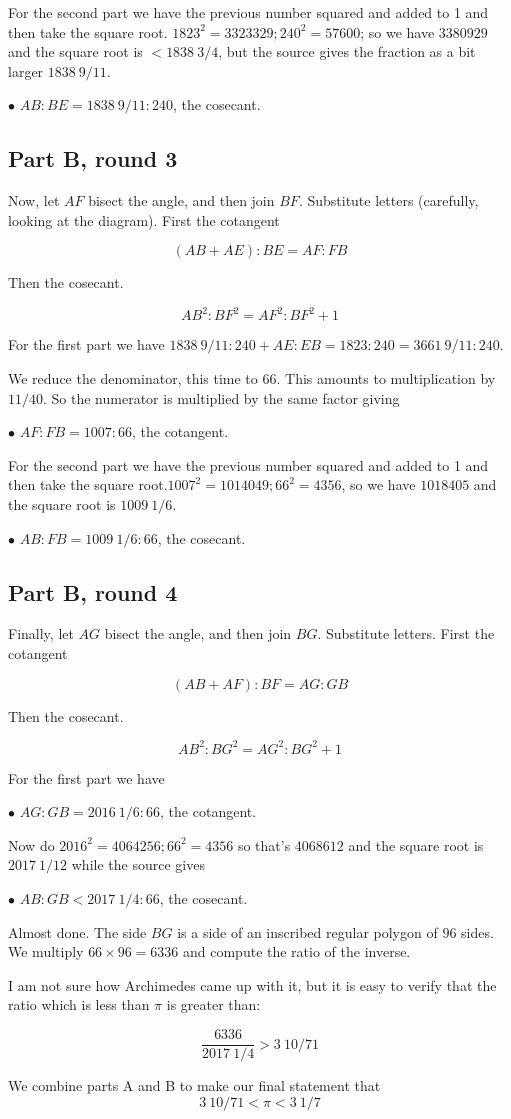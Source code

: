 \documentclass[11pt, oneside]{article}
\begin{document}
For the second part we have the previous number squared and added to 1 and then take the square root.
$1823^2 = 3323329;  240^2 = 57600$;  so we have $3380929$ and the square root is $< 1838 \ 3/4$, but the source gives the fraction as a bit larger $1838 \ 9/11$.

$\bullet$ $AB:BE = 1838 \ 9/11: 240$, the cosecant.

\subsection*{Part B, round 3}

Now, let $AF$ bisect the angle, and then join $BF$.  Substitute letters (carefully, looking at the diagram).  First the cotangent

\[ (AB + AE):BE = AF:FB \]

Then the cosecant.

\[ AB^2:BF^2 = AF^2:BF^2 + 1 \]

For the first part we have $1838 \ 9/11: 240 + AE:EB = 1823:240 = 3661 \ 9/11:240$. 

 We reduce the denominator, this time to $66$.  This amounts to multiplication by $11/40$.  So the numerator is multiplied by the same factor giving

$\bullet$ $AF:FB = 1007:66$, the cotangent.

For the second part we have the previous number squared and added to 1 and then take the square root.$1007^2 = 1014049;  66^2 = 4356$, so we have $1018405$ and the square root is $1009 \ 1/6$.

$\bullet$ $AB:FB = 1009 \ 1/6:66$, the cosecant.

\subsection*{Part B, round 4}

Finally, let $AG$ bisect the angle, and then join $BG$.  Substitute letters.  First the cotangent

\[ (AB + AF):BF = AG:GB \]

Then the cosecant.

\[ AB^2:BG^2 = AG^2:BG^2 + 1 \]

For the first part we have

$\bullet$ $AG:GB = 2016 \ 1/6:66$, the cotangent.

Now do $2016^2 = 4064256;  66^2 = 4356$ so that's $4068612$ and the square root is $2017 \ 1/12$ while the source gives

$\bullet$ $AB:GB < 2017 \ 1/4:66$, the cosecant.

Almost done.  The side $BG$ is a side of an inscribed regular polygon of $96$ sides.  We multiply $66 \times 96 = 6336$ and compute the ratio of the inverse.  

I am not sure how Archimedes came up with it, but it is easy to verify that the ratio which is less than $\pi$ is greater than:

\[ \frac{6336}{2017 \ 1/4} > 3 \ 10/71 \]

We combine parts A and B to make our final statement that
\[ 3 \ 10/71 < \pi < 3 \ 1/7 \]
\end{document}
